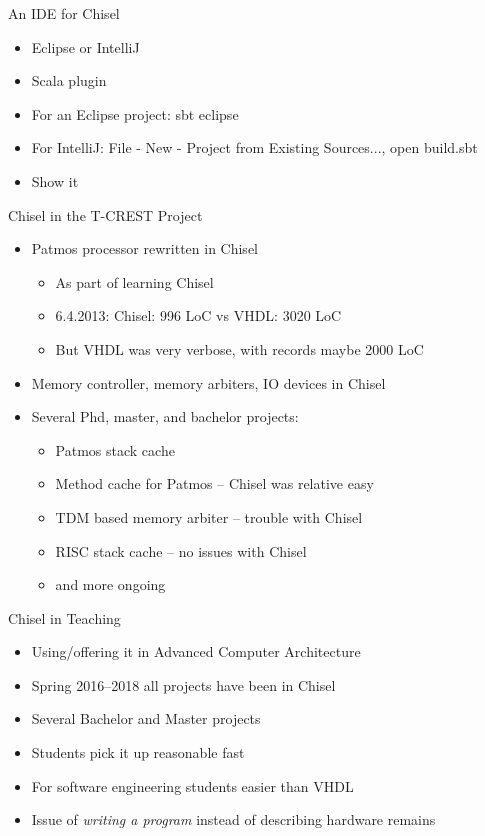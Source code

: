 \documentclass[xcolor=pdflatex,dvipsnames,table]{beamer}
\begin{document}
\begin{frame}[fragile]{An IDE for Chisel}
\begin{itemize}
\item Eclipse or IntelliJ
\item Scala plugin
\item For an Eclipse project: sbt eclipse
\item For IntelliJ: File - New - Project from Existing Sources..., open build.sbt
\item Show it
\end{itemize}
\end{frame}

\begin{frame}[fragile]{Chisel in the T-CREST Project}
\begin{itemize}
\item Patmos processor rewritten in Chisel
\begin{itemize}
\item As part of learning Chisel
\item 6.4.2013: Chisel: 996 LoC vs VHDL: 3020 LoC
\item But VHDL was very verbose, with records maybe 2000 LoC
\end{itemize}
\item Memory controller, memory arbiters, IO devices in Chisel
\item Several Phd, master, and bachelor projects:
\begin{itemize}
\item Patmos stack cache
\item Method cache for Patmos -- Chisel was relative easy
\item TDM based memory arbiter -- trouble with Chisel
\item RISC stack cache -- no issues with Chisel
\item and more ongoing 
\end{itemize}
\end{itemize}
\end{frame}

\begin{frame}[fragile]{Chisel in Teaching}
\begin{itemize}
\item Using/offering it in Advanced Computer Architecture
\item Spring 2016--2018 all projects have been in Chisel
\item Several Bachelor and Master projects
\item Students pick it up reasonable fast
\item For software engineering students easier than VHDL
\item Issue of \emph{writing a program} instead of describing hardware remains
\end{itemize}
\end{frame}
\end{document}
